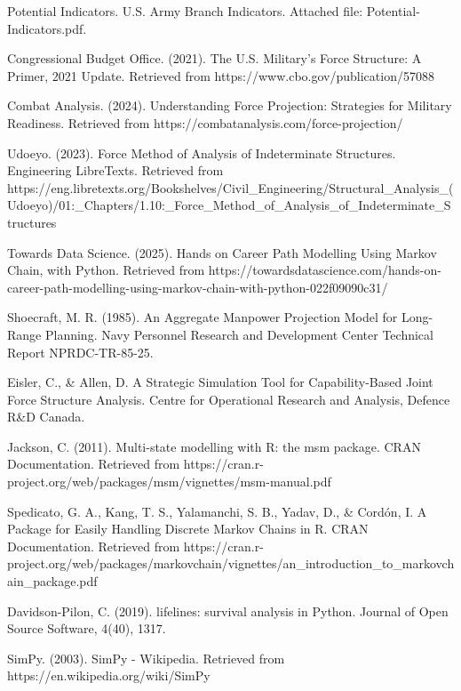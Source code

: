 \documentclass[main.tex]{subfiles}
\begin{document}
\begin{thebibliography}{21}

Potential Indicators. U.S. Army Branch Indicators. Attached file: Potential-Indicators.pdf.

Congressional Budget Office. (2021). The U.S. Military's Force Structure: A Primer, 2021 Update. Retrieved from https://www.cbo.gov/publication/57088

Combat Analysis. (2024). Understanding Force Projection: Strategies for Military Readiness. Retrieved from https://combatanalysis.com/force-projection/

Udoeyo. (2023). Force Method of Analysis of Indeterminate Structures. Engineering LibreTexts. Retrieved from https://eng.libretexts.org/Bookshelves/Civil\_Engineering/Structural\_Analysis\_(Udoeyo)/01:\_Chapters/1.10:\_Force\_Method\_of\_Analysis\_of\_Indeterminate\_Structures

Towards Data Science. (2025). Hands on Career Path Modelling Using Markov Chain, with Python. Retrieved from https://towardsdatascience.com/hands-on-career-path-modelling-using-markov-chain-with-python-022f09090c31/

Shoecraft, M. R. (1985). An Aggregate Manpower Projection Model for Long-Range Planning. Navy Personnel Research and Development Center Technical Report NPRDC-TR-85-25.

Eisler, C., \& Allen, D. A Strategic Simulation Tool for Capability-Based Joint Force Structure Analysis. Centre for Operational Research and Analysis, Defence R\&D Canada.

Jackson, C. (2011). Multi-state modelling with R: the msm package. CRAN Documentation. Retrieved from https://cran.r-project.org/web/packages/msm/vignettes/msm-manual.pdf

Spedicato, G. A., Kang, T. S., Yalamanchi, S. B., Yadav, D., \& Cordón, I. A Package for Easily Handling Discrete Markov Chains in R. CRAN Documentation. Retrieved from https://cran.r-project.org/web/packages/markovchain/vignettes/an\_introduction\_to\_markovchain\_package.pdf

Davidson-Pilon, C. (2019). lifelines: survival analysis in Python. Journal of Open Source Software, 4(40), 1317.

SimPy. (2003). SimPy - Wikipedia. Retrieved from https://en.wikipedia.org/wiki/SimPy


\end{thebibliography}
\end{document}
